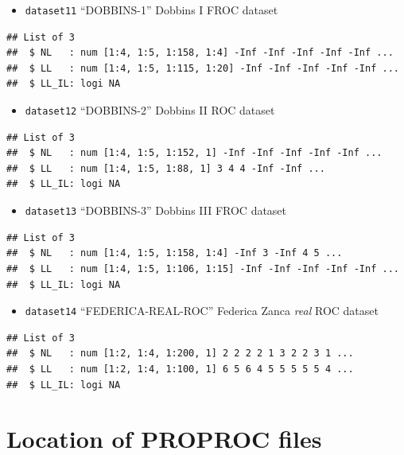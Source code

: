 \documentclass[
]{book}
\providecommand{\tightlist}{%
  \setlength{\itemsep}{0pt}\setlength{\parskip}{0pt}}
\begin{document}
\begin{itemize}
\tightlist
\item
  \texttt{dataset11} ``DOBBINS-1'' Dobbins I FROC dataset \citep{Dobbins2016MultiInstitutional}
\end{itemize}

\begin{verbatim}
## List of 3
##  $ NL   : num [1:4, 1:5, 1:158, 1:4] -Inf -Inf -Inf -Inf -Inf ...
##  $ LL   : num [1:4, 1:5, 1:115, 1:20] -Inf -Inf -Inf -Inf -Inf ...
##  $ LL_IL: logi NA
\end{verbatim}

\begin{itemize}
\tightlist
\item
  \texttt{dataset12} ``DOBBINS-2'' Dobbins II ROC dataset \citep{Dobbins2016MultiInstitutional}
\end{itemize}

\begin{verbatim}
## List of 3
##  $ NL   : num [1:4, 1:5, 1:152, 1] -Inf -Inf -Inf -Inf -Inf ...
##  $ LL   : num [1:4, 1:5, 1:88, 1] 3 4 4 -Inf -Inf ...
##  $ LL_IL: logi NA
\end{verbatim}

\begin{itemize}
\tightlist
\item
  \texttt{dataset13} ``DOBBINS-3'' Dobbins III FROC dataset \citep{Dobbins2016MultiInstitutional}
\end{itemize}

\begin{verbatim}
## List of 3
##  $ NL   : num [1:4, 1:5, 1:158, 1:4] -Inf 3 -Inf 4 5 ...
##  $ LL   : num [1:4, 1:5, 1:106, 1:15] -Inf -Inf -Inf -Inf -Inf ...
##  $ LL_IL: logi NA
\end{verbatim}

\begin{itemize}
\tightlist
\item
  \texttt{dataset14} ``FEDERICA-REAL-ROC'' Federica Zanca \emph{real} ROC dataset \citep{RN2318}
\end{itemize}

\begin{verbatim}
## List of 3
##  $ NL   : num [1:2, 1:4, 1:200, 1] 2 2 2 2 1 3 2 2 3 1 ...
##  $ LL   : num [1:2, 1:4, 1:100, 1] 6 5 6 4 5 5 5 5 5 4 ...
##  $ LL_IL: logi NA
\end{verbatim}

\hypertarget{rsm-3-fits-one-dataset-proproc}{%
\section{Location of PROPROC files}\label{rsm-3-fits-one-dataset-proproc}}
\end{document}
